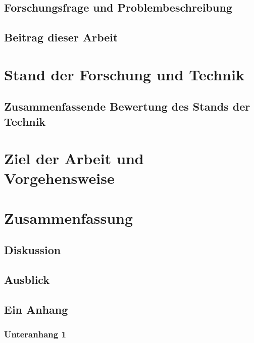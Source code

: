 \documentclass[
english, ngerman,%
twoside, %
toc=bib, %
BCOR=6mm, %
ingenieurin, %
]{isw_smb_diss} %
\numberwithin{equation}{chapter} %
\begin{document}
\Blindtext

\section{Forschungsfrage und Problembeschreibung}
\section{Beitrag dieser Arbeit}

\chapter{Stand der Forschung und Technik}
\section{Zusammenfassende Bewertung des Stands der Technik}

\chapter{Ziel der Arbeit und Vorgehensweise}



\chapter{Zusammenfassung}
\section{Diskussion}
\section{Ausblick}

\nocite{*}

\setlength{\emergencystretch}{.5em}
\printbibliography





\startSMBAppendix

\section{Ein Anhang}
\subsection{Unteranhang 1}
\end{document}
